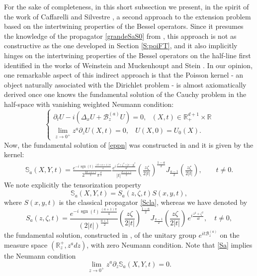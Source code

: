 \documentclass[11pt,letter]{amsart}
\def \R {\mathbb{R}}
\newcommand{\Ba}{\mathscr B_z^{(a)}}
\newcommand{\p}{\partial}
\numberwithin{equation}{section}
\numberwithin{equation}{section}
\begin{document}
For the sake of completeness, in this short subsection we present, in the spirit of the work of Caffarelli and Silvestre \cite[Sections 2.2 \& 2.3]{CS}, a second approach to the extension problem based on the intertwining properties of the Bessel operators. Since it presumes the knowledge of the propagator \eqref{grandeSaS0} from \cite{GS1, GS2},  
this approach is not as constructive as the one developed in Section \ref{S:poiFT}, and it also implicitly hinges on the intertwining properties of the Bessel operators on the half-line first identified in the works of Weinstein \cite{We48, We2} and Muckenhoupt and Stein \cite{MS}. In our opinion, one remarkable aspect of this indirect approach is that the Poisson kernel - an object naturally associated with the Dirichlet problem - is almost axiomatically derived once one knows the fundamental solution of the Cauchy problem in the half-space with vanishing weighted Neumann condition:
\begin{equation}\label{eppn}
\begin{cases}
\p_t U - i \left( \Delta_x U+\mathscr B_z^{(a)} U\right) = 0,\ \ \ (X,t)\in \R_+^{d+1}\times \R
\\
\underset{z\to 0^+}{\lim} z^a \p_z U(X,t) = 0,\ \  \ \ U(X,0) = U_0(X).
\end{cases}
\end{equation}
Now, the fundamental solution of  \eqref{eppn} was constructed in \cite{GS2} and it is given by the kernel:
\begin{align}\label{grandeSaS0}
\mathbb S_a(X,Y,t)
= \frac{e^{-i\,\operatorname{sgn}(t)\,\frac{(d+a+1)\pi}{4}}}{2^{\frac{2d+a+1}{2}}\pi^{\frac d2}}  
\frac{e^{i\,\frac{z^2+\zeta^2+|x-y|^2}{4t}}}{|t|^{\frac{d+a+1}{2}}}\left(\frac{z\zeta}{2|t|}\right)^{\frac{1-a}{2}}
J_{\frac{a-1}{2}}\!\left(\frac{z\zeta}{2|t|}\right),
\qquad t\neq 0.
\end{align}
We note explicitly the tensorization property
\begin{equation}\label{Sa}
\mathbb S_a(X,Y,t) =  S_a(z,\zeta,t) S(x,y,t),
\end{equation}
where $S(x,y,t)$ is the classical propagator \eqref{Scla}, whereas we have denoted by 
\begin{equation}\label{SaS}
S_a(z,\zeta,t)
=
\frac{e^{-i\,\operatorname{sgn}(t)\,\frac{(a+1)\pi}{4}}}{(2|t|)^{\frac{a+1}{2}}}
\left(\frac{z\zeta}{2|t|}\right)^{\frac{1-a}{2}}
J_{\frac{a-1}{2}}\!\left(\frac{z\zeta}{2|t|}\right)
\,e^{i \frac{z^2+\zeta^2}{4t}}, \quad t \neq 0,
\end{equation}
the fundamental solution, constructed in \cite{GS1},  of the unitary group $e^{i t \Ba}$ on the measure space $(\R^+_z, z^a dz)$, with zero Neumann condition.
Note that \eqref{Sa} implies the Neumann condition
\begin{equation}\label{Sazeron}
\underset{z\to 0^+}{\lim} z^a \p_z \mathbb S_a(X,Y,t) = 0.
\end{equation}
\end{document}
